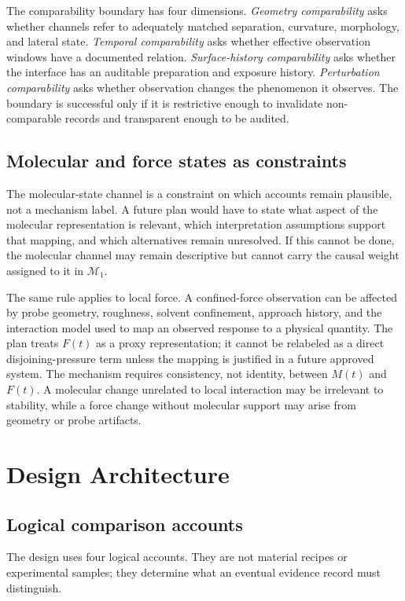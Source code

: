\documentclass[conference]{IEEEtran}
\begin{document}
The comparability boundary has four dimensions. \emph{Geometry comparability} asks whether channels refer to adequately matched separation, curvature, morphology, and lateral state. \emph{Temporal comparability} asks whether effective observation windows have a documented relation. \emph{Surface-history comparability} asks whether the interface has an auditable preparation and exposure history. \emph{Perturbation comparability} asks whether observation changes the phenomenon it observes. The boundary is successful only if it is restrictive enough to invalidate non-comparable records and transparent enough to be audited.

\subsection{Molecular and force states as constraints}

The molecular-state channel is a constraint on which accounts remain plausible, not a mechanism label. A future plan would have to state what aspect of the molecular representation is relevant, which interpretation assumptions support that mapping, and which alternatives remain unresolved. If this cannot be done, the molecular channel may remain descriptive but cannot carry the causal weight assigned to it in $\mathcal{M}_{1}$.

The same rule applies to local force. A confined-force observation can be affected by probe geometry, roughness, solvent confinement, approach history, and the interaction model used to map an observed response to a physical quantity. The plan treats $F(t)$ as a proxy representation; it cannot be relabeled as a direct disjoining-pressure term unless the mapping is justified in a future approved system. The mechanism requires consistency, not identity, between $M(t)$ and $F(t)$. A molecular change unrelated to local interaction may be irrelevant to stability, while a force change without molecular support may arise from geometry or probe artifacts.

\section{Design Architecture}

\subsection{Logical comparison accounts}

The design uses four logical accounts. They are not material recipes or experimental samples; they determine what an eventual evidence record must distinguish.
\end{document}
